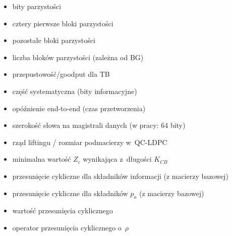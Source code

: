 \begin{itemize}
\item[$p$] bity parzystości
\item[$p_a$] cztery pierwsze bloki parzystości
\item[$p_c$] pozostałe bloki parzystości
\item[$P_B$] liczba bloków parzystości (zależna od BG)
\item[$R_{TB}$] przepustowość/goodput dla TB
\item[$s$] część systematyczna (bity informacyjne)
\item[$T_{E2E}$] opóźnienie end-to-end (czas przetworzenia)
\item[$W$] szerokość słowa na magistrali danych (w pracy: 64 bity)
\item[$Z_c$] rząd liftingu / rozmiar podmacierzy w~QC-LDPC
\item[$Z_{c,\min}$] minimalna wartość $Z_c$ wynikająca z~długości $K_{CB}$
\item[$\alpha_{t,j}$] przesunięcie cykliczne dla składników informacji (z macierzy bazowej)
\item[$\beta_{t,j}$] przesunięcie cykliczne dla składników $p_a$ (z macierzy bazowej)
\item[$\rho$] wartość przesunięcia cyklicznego
\item[$\mathrm{rot}(\cdot,\rho)$] operator przesunięcia cyklicznego o~$\rho$

\end{itemize}
